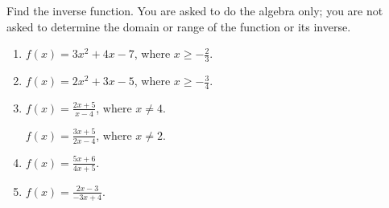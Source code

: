 Find the inverse function. You are asked to do the algebra only; you are not asked to determine the domain or range of the function or its inverse. 
\begin{enumerate} [ref={\fcProblemRef}]
\item $f(x)= 3x^2+4x-7$, where $x\geq -\frac{2}{3}$.

\item $f(x)= 2x^2+3x-5$, where $x\geq -\frac{3}{4}$.

\item $\displaystyle f(x)= \frac{2x+5}{x-4}$, where $x\neq 4$.

 \label{problemFindInversef=(3x+5)/(2x-4)} $\displaystyle f(x)= \frac{3x+5}{2x-4}$, where $x\neq 2$.

\item \label{problemFindIversef=(5x+6)/(4x+5)}  $\displaystyle f(x)= \frac{5x+6}{4x+5}$.

\item  $\displaystyle f(x)= \frac{2x-3}{-3x+4}$.

\end{enumerate}
